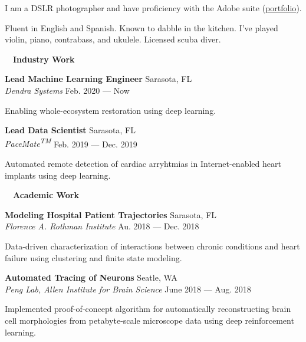 \documentclass[a4paper,12pt]{article}
\newcommand{\resheading}[1]{{\hspace{-9pt} \colorbox{mygrey}{\begin{minipage}{\textwidth}{\textmd{~~\large \textbf{#1} \vphantom{p\^{E}}}}\end{minipage}}\vspace{6pt}} }
\newcommand{\ressubheading}[4]{{\begin{minipage}{\textwidth}
                                    \textbf{#1} \hfill #2 \\
                                    \textit{#3} \hfill #4 \\
\end{minipage}}}
\begin{document}
    \begin{description}
        \setlength{\itemsep}{0mm}
        \item[Photography] I am a DSLR photographer and have proficiency with the Adobe suite (\href{https://www.flickr.com/photos/richarddecal/sets/72157640025469005/}{portfolio}).
        \item[Other] Fluent in English and Spanish. Known to dabble in the kitchen. I've played violin, piano, contrabass, and ukulele. Licensed scuba diver.
    \end{description}

    \resheading{Industry Work}

    \ressubheading{Lead Machine Learning Engineer}{Sarasota, FL}{Dendra Systems}{Feb. 2020 --- Now}

    \vspace{-6pt} Enabling whole-ecosystem restoration using deep learning.\\

    \ressubheading{Lead Data Scientist}{Sarasota, FL}{PaceMate\textsuperscript{TM}}{Feb. 2019 --- Dec. 2019}

    \vspace{-6pt} Automated remote detection of cardiac arryhtmias in Internet-enabled heart implants using deep learning.\\

    \resheading{Academic Work}


    \ressubheading{Modeling Hospital Patient Trajectories}{Sarasota, FL}{Florence A. Rothman Institute}{Au. 2018 --- Dec. 2018}

    \vspace{-6pt} Data-driven characterization of interactions between chronic conditions and heart failure using clustering and finite state modeling.\\

    \ressubheading{Automated Tracing of Neurons}{Seatle, WA}{Peng Lab, Allen Institute for Brain Science}{June 2018 --- Aug. 2018}

    \vspace{-6pt} Implemented proof-of-concept algorithm for automatically reconstructing brain cell morphologies from petabyte-scale microscope data using deep reinforcement learning.\\ %
\end{document}
